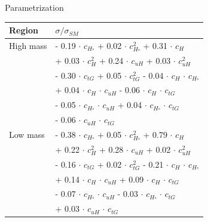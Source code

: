 \begin{frame}{Parametrization}
\begin{table}[]
    \begin{tabular}{ll}
    \hline\hline
    Region  & $\sigma/\sigma_{SM}$ \\
    \hline
    High mass &  - 0.19 $\cdot$ $c_{H\square}$ + 0.02 $\cdot$ $c_{H\square}^2$  + \textcolor{HHred}{0.31 $\cdot$ $c_{H}$}\\
    & + 0.03 $\cdot$ $c_{H}^2$ + 0.24 $\cdot$ $c_{uH}$ + 0.03 $\cdot$ $c_{uH}^2$ \\
    & - \textcolor{HHred}{0.30 $\cdot$ $c_{tG}$} + 0.05 $\cdot$ $c_{tG}^2$ - 0.04 $\cdot$ $c_{H}$ $\cdot$ $c_{H\square}$ \\
   & + 0.04 $\cdot$ $c_{H}$ $\cdot$ $c_{uH}$ - 0.06 $\cdot$ $c_{H}$ $\cdot$ $c_{tG}$ \\
   & - 0.05 $\cdot$ $c_{H\square}$ $\cdot$ $c_{uH}$ + 0.04 $\cdot$ $c_{H\square}$ $\cdot$ $c_{tG}$ \\
   & - 0.06 $\cdot$ $c_{uH}$ $\cdot$ $c_{tG}$ \\ 
   \hline
    Low mass &
    - 0.38 $\cdot$ $c_{H\square}$ + 0.05 $\cdot$ $c_{H\square}^2$ + \textcolor{HHturquoise_d}{0.79 $\cdot$ $c_{H}$} \\
  & +  0.22 $\cdot$ $c_{H}^2$ + 0.28 $\cdot$ $c_{uH}$ +  0.02 $\cdot$ $c_{uH}^2$ \\
  & - \textcolor{HHturquoise_d}{0.16 $\cdot$ $c_{tG}$} + 0.02 $\cdot$ $c_{tG}^2$  - 0.21 $\cdot$ $c_{H}$ $\cdot$ $c_{H\square}$ \\
  & + 0.14 $\cdot$ $c_{H}$ $\cdot$ $c_{uH}$ + 0.09 $\cdot$ $c_{H}$ $\cdot$ $c_{tG}$ \\
  & - 0.07 $\cdot$ $c_{H\square}$ $\cdot$ $c_{uH}$ - 0.03 $\cdot$ $c_{H\square}$ $\cdot$ $c_{tG}$ \\
  & + 0.03 $\cdot$ $c_{uH}$ $\cdot$ $c_{tG}$ \\
  \hline\hline
    \end{tabular}
\end{table}    
\end{frame}

